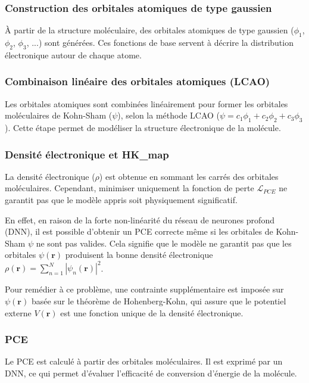 \subsubsection{Construction des orbitales atomiques de type gaussien}
À partir de la structure moléculaire, des orbitales atomiques de type gaussien ($\phi_1$, $\phi_2$, $\phi_3$, ...) sont générées. Ces fonctions de base servent à décrire la distribution électronique autour de chaque atome.

\subsubsection{Combinaison linéaire des orbitales atomiques (LCAO)}
Les orbitales atomiques sont combinées linéairement pour former les orbitales moléculaires de Kohn-Sham ($\psi$), selon la méthode LCAO ($\psi = c_1\phi_1 + c_2\phi_2 + c_3\phi_3$). Cette étape permet de modéliser la structure électronique de la molécule.

\subsubsection{Densité électronique et HK\_map}
La densité électronique ($\rho$) est obtenue en sommant les carrés des orbitales moléculaires. Cependant, minimiser uniquement la fonction de perte $\mathcal{L}_{PCE}$ ne garantit pas que le modèle appris soit physiquement significatif. 

En effet, en raison de la forte non-linéarité du réseau de neurones profond (DNN), il est possible d'obtenir un PCE correcte même si les orbitales de Kohn-Sham $\psi$ ne sont pas valides. Cela signifie que le modèle ne garantit pas que les orbitales $\psi(\mathbf{r})$ produisent la bonne densité électronique $\rho(\mathbf{r}) = \sum_{n=1}^N |\psi_n(\mathbf{r})|^2$.

Pour remédier à ce problème, une contrainte supplémentaire est imposée sur $\psi(\mathbf{r})$ basée sur le théorème de Hohenberg-Kohn, qui assure que le potentiel externe $V(\mathbf{r})$ est une fonction unique de la densité électronique.

\subsubsection{PCE}
Le PCE est calculé à partir des orbitales moléculaires. Il est exprimé par un DNN, ce qui permet d'évaluer l'efficacité de conversion d'énergie de la molécule. \\

